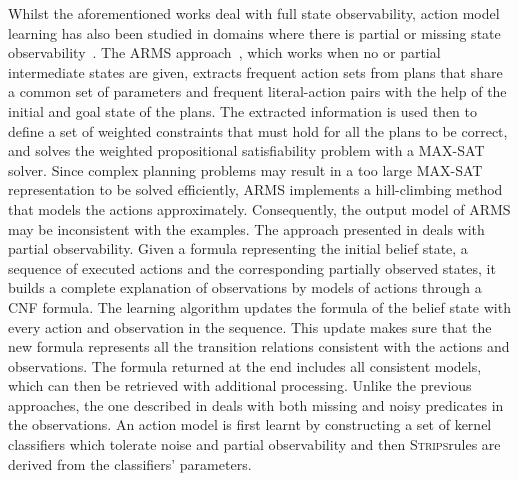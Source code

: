 \documentclass[letterpaper]{article} %
\newcommand{\strips}{\textsc{Strips}}     %
\begin{document}
Whilst the aforementioned works deal with full state observability, action model learning has also been studied in domains
where there is partial or missing state observability~\cite{jimenez2012review}. The {\sf ARMS} approach~\cite{yang2007learning}, which works when no or partial intermediate states are given, extracts frequent action sets from plans that share a common set of parameters and frequent literal-action pairs with the help of the initial and goal state of the plans. The extracted information is used then to define a set of weighted constraints that must hold for all the plans to be correct, and solves the weighted propositional satisfiability problem with a MAX-SAT solver. Since complex planning problems may result in a too large MAX-SAT representation to be solved efficiently, {\sf ARMS} implements a hill-climbing method that models the actions approximately. Consequently, the output model of {\sf ARMS} may be inconsistent with the examples. The approach presented in \cite{amir:alearning:JAIR08} deals with partial observability. Given a formula representing the initial belief state, a sequence of executed actions and the corresponding partially observed states, it builds a complete explanation
of observations by models of actions through a CNF formula. The learning algorithm updates the formula of the belief state with every action and observation in the sequence. This update makes sure that the new formula represents all the transition relations consistent with the actions and observations. The formula returned at the end includes all consistent models, which can then be retrieved with additional processing. Unlike the previous approaches, the one described in \cite{MouraoZPS12} deals with both missing and noisy predicates in the observations. An action model is first learnt by constructing a set of kernel classifiers which tolerate noise and partial observability and then \strips rules are derived from the classifiers' parameters.
\end{document}
